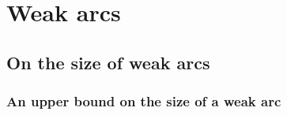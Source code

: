 \documentclass{article}
\newtheorem{theorem}{Theorem}
\begin{document}
\section{Weak arcs}






\subsection{On the size of weak arcs}\label{subs:size}
\subsubsection{An upper bound on the size of a weak arc}






\end{document}
